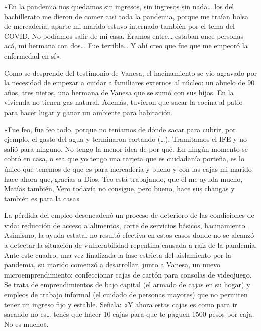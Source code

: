 \begin{refsection}
\begin{gbcita}
«En la pandemia nos quedamos sin ingresos, sin ingresos sin nada… los del bachillerato me dieron de comer casi toda la pandemia, porque me traían bolsa de mercadería, aparte mi marido estuvo internado también por el tema del COVID. No podíamos salir de mi casa. Éramos entre… estaban once personas acá, mi hermana con dos… Fue terrible… Y ahí creo que fue que me empeoró la enfermedad en sí».

\end{gbcita}

Como se desprende del testimonio de Vanesa, el hacinamiento se vio agravado por la necesidad de empezar a cuidar a familiares externos al núcleo: un abuelo de 90 años, tres nietos, una hermana de Vanesa que se sumó con sus hijos. En la vivienda no tienen gas natural. Además, tuvieron que sacar la cocina al patio para hacer lugar y ganar un ambiente para habitación.


\begin{gbcita}
«Fue feo, fue feo todo, porque no teníamos de dónde sacar para cubrir, por ejemplo, el gasto del agua y terminaron cortando (…). Tramitamos el IFE y no salió para ninguno. No tengo la menor idea de por qué. En ningún momento se cobró en casa, o sea que yo tengo una tarjeta que es ciudadanía porteña, es lo único que tenemos de que es para mercadería y bueno y con las cajas mi marido hace ahora que, gracias a Dios, Teo está trabajando, que él me ayuda mucho, Matías también, Vero todavía no consigue, pero bueno, hace sus changas y también es para la casa»

\end{gbcita}

La pérdida del empleo desencadenó un proceso de deterioro de las condiciones de vida: reducción de acceso a alimentos, corte de servicios básicos, hacinamiento. Asimismo, la ayuda estatal no resultó efectiva en estos casos donde no se alcanzó a detectar la situación de vulnerabilidad repentina causada a raíz de la pandemia. Ante este cuadro, una vez finalizada la fase estricta del aislamiento por la pandemia, su marido comenzó a desarrollar, junto a Vanesa, un nuevo microemprendimiento: confeccionar cajas de cartón para consolas de videojuego. Se trata de emprendimientos de bajo capital (el armado de cajas en su hogar) y empleos de trabajo informal (el cuidado de personas mayores) que no permiten tener un ingreso fijo y estable. Señala: «Y ahora estas cajas es como para ir sacando no es… tenés que hacer 10 cajas para que te paguen \num{1500} pesos por caja. No es mucho».


\end{refsection}
